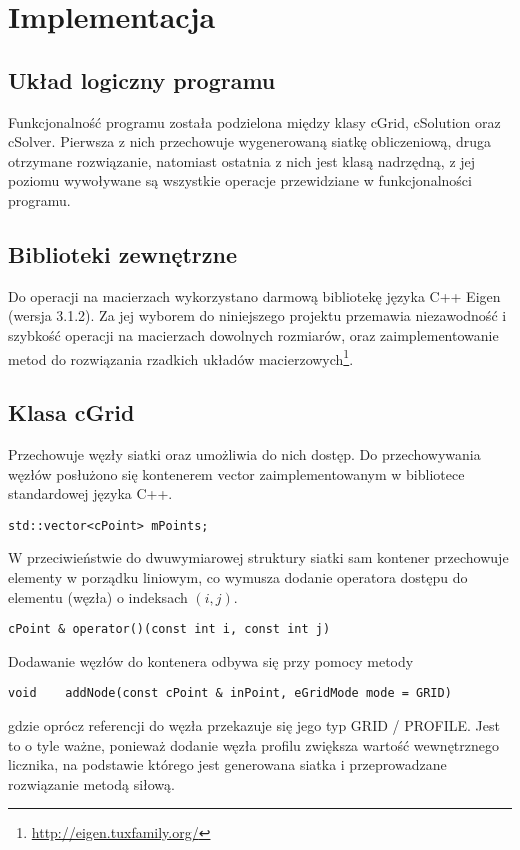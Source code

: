 \chapter{Implementacja}

\indent 


\section{Układ logiczny programu}

\indent\indent Funkcjonalność programu została podzielona między klasy \textsf{cGrid, cSolution} oraz \textsf{cSolver}. Pierwsza z nich przechowuje wygenerowaną siatkę obliczeniową, druga otrzymane rozwiązanie, natomiast  ostatnia z nich jest klasą nadrzędną, z jej poziomu wywoływane są wszystkie operacje przewidziane w funkcjonalności programu. 

\section{Biblioteki zewnętrzne}\label{sec:bibl_zewn}

\indent\indent Do operacji na macierzach wykorzystano darmową bibliotekę języka C++ Eigen (wersja 3.1.2). Za jej wyborem do niniejszego projektu przemawia niezawodność i szybkość operacji na macierzach dowolnych rozmiarów, oraz zaimplementowanie metod do rozwiązania rzadkich układów macierzowych\footnote{\url{http://eigen.tuxfamily.org/}}.

\section{Klasa cGrid}

\indent\indent Przechowuje węzły siatki oraz umożliwia do nich dostęp. Do przechowywania węzłów posłużono się kontenerem \textsf{vector} zaimplementowanym w bibliotece standardowej języka C++.

\begin{lstlisting}[style = nonumbers]
	std::vector<cPoint> mPoints;	
\end{lstlisting}

\noindent W przeciwieństwie do dwuwymiarowej struktury siatki sam kontener przechowuje elementy w porządku liniowym, co wymusza dodanie operatora dostępu do elementu (węzła) o indeksach $(i,j)$.
\begin{lstlisting}[style = nonumbers]
	cPoint & operator()(const int i, const int j)
\end{lstlisting}
\noindent Dodawanie węzłów do kontenera odbywa się przy pomocy metody 
\begin{lstlisting}[style = nonumbers]
	void	addNode(const cPoint & inPoint, eGridMode mode = GRID)	
\end{lstlisting}	
gdzie oprócz referencji do węzła przekazuje się jego typ \textsf{GRID / PROFILE}. Jest to o tyle ważne, ponieważ dodanie węzła profilu zwiększa wartość wewnętrznego licznika, na podstawie którego jest generowana siatka i przeprowadzane rozwiązanie metodą siłową.

